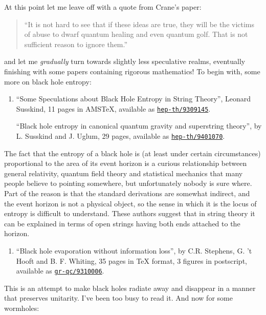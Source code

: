 \documentclass{article}
\def\tightlist{}
\begin{document}
At this point let me leave off with a quote from Crane's paper:

\begin{quote}
``It is not hard to see that if these ideas are true, they will be the
victims of abuse to dwarf quantum healing and even quantum golf. That is
not sufficient reason to ignore them.''
\end{quote}

and let me \emph{gradually} turn towards slightly less speculative
realms, eventually finishing with some papers containing rigorous
mathematics! To begin with, some more on black hole entropy:

\begin{enumerate}
\def\labelenumi{\arabic{enumi})}
\setcounter{enumi}{4}
\item
  ``Some Speculations about Black Hole Entropy in String Theory'',
  Leonard Susskind, 11 pages in AMSTeX, available as
  \href{http://xxx.lanl.gov/abs/hep-th/9309145}{\texttt{hep-th/9309145}}.

  ``Black hole entropy in canonical quantum gravity and superstring
  theory'', by L. Susskind and J. Uglum, 29 pages, available as
  \href{http://xxx.lanl.gov/abs/hep-th/9401070}{\texttt{hep-th/9401070}}.
\end{enumerate}

The fact that the entropy of a black hole is (at least under certain
circumstances) proportional to the area of its event horizon is a
curious relationship between general relativity, quantum field theory
and statistical mechanics that many people believe to pointing
somewhere, but unfortunately nobody is sure where. Part of the reason is
that the standard derivations are somewhat indirect, and the event
horizon is not a physical object, so the sense in which it is the locus
of entropy is difficult to understand. These authors suggest that in
string theory it can be explained in terms of open strings having both
ends attached to the horizon.

\begin{enumerate}
\def\labelenumi{\arabic{enumi})}
\setcounter{enumi}{5}
\tightlist
\item
  ``Black hole evaporation without information loss'', by C.R. Stephens,
  G. 't Hooft and B. F. Whiting, 35 pages in TeX format, 3 figures in
  postscript, available as
  \href{http://xxx.lanl.gov/abs/gr-qc/9310006}{\texttt{gr-qc/9310006}}.
\end{enumerate}

This is an attempt to make black holes radiate away and disappear in a
manner that preserves unitarity. I've been too busy to read it. And now
for some wormholes:
\end{document}
